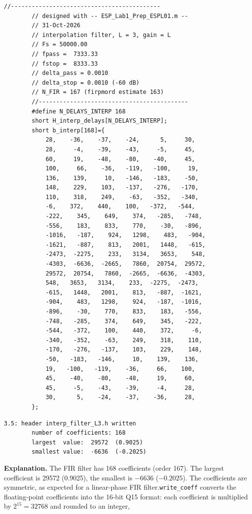 \documentclass[a4paper,11pt]{article}
\begin{document}
	\begin{lstlisting}[style=ccode,caption={generated C-Header with write\_coeff.m }, label={lst:C-headerfile3.5}]
		//------------------------------------------- 
		// designed with -- ESP_Lab1_Prep_ESPL01.m -- 
		// 31-Oct-2026
		// interpolation filter, L = 3, gain = L
		// Fs = 50000.00
		// fpass =  7333.33
		// fstop =  8333.33
		// delta_pass = 0.0010
		// delta_stop = 0.0010 (-60 dB)
		// N_FIR = 167 (firpmord estimate 163)
		//------------------------------------------- 
		#define N_DELAYS_INTERP 168
		short H_interp_delays[N_DELAYS_INTERP]; 
		short b_interp[168]={
			28,    -36,    -37,    -24,      5,     30,
			28,     -4,    -39,    -43,     -5,     45,
			60,     19,    -48,    -80,    -40,     45,
			100,     66,    -36,   -119,   -100,     19,
			136,    139,     10,   -146,   -183,    -50,
			148,    229,    103,   -137,   -276,   -170,
			110,    318,    249,    -63,   -352,   -340,
			-6,    372,    440,    100,   -372,   -544,
			-222,    345,    649,    374,   -285,   -748,
			-556,    183,    833,    770,    -30,   -896,
			-1016,   -187,    924,   1298,    483,   -904,
			-1621,   -887,    813,   2001,   1448,   -615,
			-2473,  -2275,    233,   3134,   3653,    548,
			-4303,  -6636,  -2665,   7860,  20754,  29572,
			29572,  20754,   7860,  -2665,  -6636,  -4303,
			548,   3653,   3134,    233,  -2275,  -2473,
			-615,   1448,   2001,    813,   -887,  -1621,
			-904,    483,   1298,    924,   -187,  -1016,
			-896,    -30,    770,    833,    183,   -556,
			-748,   -285,    374,    649,    345,   -222,
			-544,   -372,    100,    440,    372,     -6,
			-340,   -352,    -63,    249,    318,    110,
			-170,   -276,   -137,    103,    229,    148,
			-50,   -183,   -146,     10,    139,    136,
			19,   -100,   -119,    -36,     66,    100,
			45,    -40,    -80,    -48,     19,     60,
			45,     -5,    -43,    -39,     -4,     28,
			30,      5,    -24,    -37,    -36,     28,
		};
	\end{lstlisting}
	
	
	\begin{lstlisting}[style=matlab, caption={MATLAB command window output, Section 3.5}, label={lst:out35}]
	3.5: header interp_filter_L3.h written
		number of coefficients: 168
		largest  value:  29572  (0.9025)
		smallest value:  -6636  (-0.2025)
	\end{lstlisting}
	
	\noindent\textbf{Explanation.} The FIR filter has 168 coefficients (order 167). The largest coefficient is 29572 (0.9025), the smallest is $-6636$ ($-0.2025$). The coefficients are symmetric, as expected for a linear-phase FIR filter.\texttt{write\_coeff} converts the floating-point coefficients into the 16-bit Q15 format: each coefficient is multiplied by $2^{15} = 32768$ and rounded to an integer,
\end{document}
